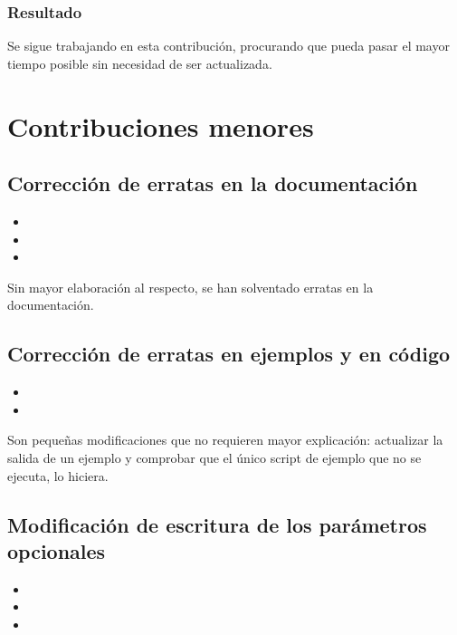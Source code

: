 \subsubsection{Resultado}

Se sigue trabajando en esta contribución, procurando que pueda pasar el mayor tiempo posible sin necesidad de ser actualizada.

\section{Contribuciones menores} \label{sct:desarrollo:contribuciones_menores}

\subsection{Corrección de erratas en la documentación}

\begin{itemize}
    \item {}
    \item {}
    \item {}
\end{itemize}

Sin mayor elaboración al respecto, se han solventado erratas en la documentación.

\subsection{Corrección de erratas en ejemplos y en código}

\begin{itemize}
    \item {}
    \item {}
\end{itemize}

Son pequeñas modificaciones que no requieren mayor explicación: actualizar la salida de un ejemplo y comprobar que el único script de ejemplo que no se ejecuta, lo hiciera.

\subsection{Modificación de escritura de los parámetros opcionales}

\begin{itemize}
    \item {}
    \item {}
    \item {}
\end{itemize}

